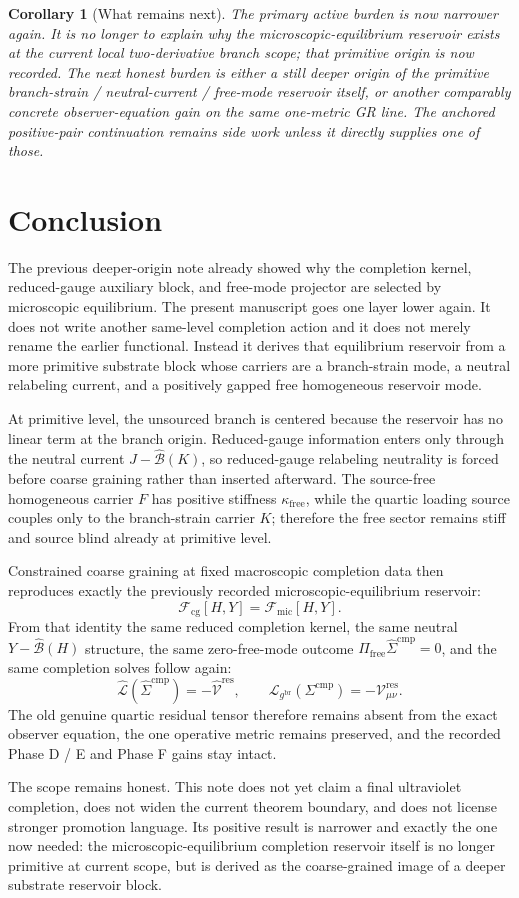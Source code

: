 \documentclass[11pt]{article}
\newcommand{\ObserverMetric}{g^{\mathrm{br}}}
\newcommand{\CompShift}{\Sigma^{\mathrm{cmp}}}
\newcommand{\CompLift}{\widehat\Sigma^{\mathrm{cmp}}}
\newcommand{\ResidualCore}{\mathcal V_{\mu\nu}^{\mathrm{res}}}
\newcommand{\ResidualLift}{\widehat{\mathcal V}^{\mathrm{res}}}
\newcommand{\SubGaugeVec}{\widehat{\mathcal B}}
\newcommand{\SubReducedEin}{\widehat{\mathcal L}}
\newcommand{\FreeProj}{\Pi_{\mathrm{free}}}
\newcommand{\GaugeAux}{Y}
\newcommand{\ReducedEin}{\mathcal L_{\ObserverMetric}}
\newcommand{\MicFunctional}{\mathscr F_{\mathrm{mic}}}
\newcommand{\CoarseFunctional}{\mathscr F_{\mathrm{cg}}}
\newcommand{\FreeStiff}{\kappa_{\mathrm{free}}}
\newcommand{\PrimStrain}{K}
\newcommand{\PrimNeutral}{J}
\newcommand{\PrimFree}{F}
\newtheorem{corollary}{Corollary}
\begin{document}
\begin{corollary}[What remains next]
The primary active burden is now narrower again. It is no longer to explain why the microscopic-equilibrium reservoir exists at the current local two-derivative branch scope; that primitive origin is now recorded. The next honest burden is either a still deeper origin of the primitive branch-strain / neutral-current / free-mode reservoir itself, or another comparably concrete observer-equation gain on the same one-metric GR line. The anchored positive-pair continuation remains side work unless it directly supplies one of those.
\end{corollary}

\section{Conclusion}

The previous deeper-origin note already showed why the completion kernel, reduced-gauge auxiliary block, and free-mode projector are selected by microscopic equilibrium. The present manuscript goes one layer lower again. It does not write another same-level completion action and it does not merely rename the earlier functional. Instead it derives that equilibrium reservoir from a more primitive substrate block whose carriers are a branch-strain mode, a neutral relabeling current, and a positively gapped free homogeneous reservoir mode.

At primitive level, the unsourced branch is centered because the reservoir has no linear term at the branch origin. Reduced-gauge information enters only through the neutral current \(\PrimNeutral-\SubGaugeVec(\PrimStrain)\), so reduced-gauge relabeling neutrality is forced before coarse graining rather than inserted afterward. The source-free homogeneous carrier \(\PrimFree\) has positive stiffness \(\FreeStiff\), while the quartic loading source couples only to the branch-strain carrier \(\PrimStrain\); therefore the free sector remains stiff and source blind already at primitive level.

Constrained coarse graining at fixed macroscopic completion data then reproduces exactly the previously recorded microscopic-equilibrium reservoir:
\[
\CoarseFunctional[H,\GaugeAux]=\MicFunctional[H,\GaugeAux].
\]
From that identity the same reduced completion kernel, the same neutral \( \GaugeAux-\SubGaugeVec(H)\) structure, the same zero-free-mode outcome \(\FreeProj\CompLift=0\), and the same completion solves follow again:
\[
\SubReducedEin(\CompLift)=-\ResidualLift,
\qquad
\ReducedEin(\CompShift)=-\ResidualCore.
\]
The old genuine quartic residual tensor therefore remains absent from the exact observer equation, the one operative metric remains preserved, and the recorded Phase D / E and Phase F gains stay intact.

The scope remains honest. This note does not yet claim a final ultraviolet completion, does not widen the current theorem boundary, and does not license stronger promotion language. Its positive result is narrower and exactly the one now needed: the microscopic-equilibrium completion reservoir itself is no longer primitive at current scope, but is derived as the coarse-grained image of a deeper substrate reservoir block.
\end{document}
